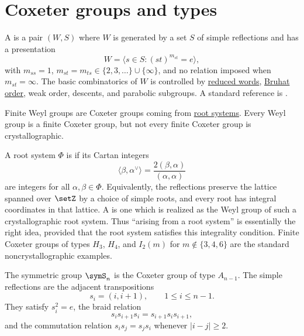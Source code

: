 
\section[coxeterGroups]{Coxeter groups and types}

A \label{coxeterSystemDefinition} is a pair \((W,S)\)
where \(W\) is generated by a set \(S\) of simple reflections and has a
presentation
\[
  W=\langle s\in S : (st)^{m_{st}}=e\rangle,
\]
with \(m_{ss}=1\), \(m_{st}=m_{ts}\in\{2,3,\dotsc\}\cup\{\infty\}\), and no
relation imposed when \(m_{st}=\infty\).  The basic combinatorics of \(W\)
is controlled by \hyperref[reducedWord]{reduced words},
\hyperref[bruhatOrder]{Bruhat order}, weak order, descents, and parabolic
subgroups.  A standard reference is \cite{Bjorner2005}.

Finite Weyl groups are Coxeter groups coming from
\hyperref[rootSystem]{root systems}.  Every Weyl group is a finite Coxeter
group, but not every finite Coxeter group is crystallographic.

A root system \(\Phi\) is  if its Cartan integers
\[
  \langle\beta,\alpha^\vee\rangle
  =
  \frac{2(\beta,\alpha)}{(\alpha,\alpha)}
\]
are integers for all \(\alpha,\beta\in\Phi\).  Equivalently, the reflections
preserve the lattice spanned over \(\setZ\) by a choice of simple roots, and
every root has integral coordinates in that lattice.  A
\label{crystallographicCoxeterGroup} is
one which is realized as the Weyl group of such a crystallographic root
system.  Thus \enquote{arising from a root system} is essentially the right
idea, provided that the root system satisfies this integrality condition.
Finite Coxeter groups of types \(H_3\), \(H_4\), and \(I_2(m)\) for
\(m\notin\{3,4,6\}\) are the standard noncrystallographic examples.

\begin{example}
The symmetric group \(\symS_n\) is the Coxeter group of type \(A_{n-1}\).
The simple reflections are the adjacent transpositions
\[
  s_i=(i,i+1),\qquad 1\leq i\leq n-1.
\]
They satisfy \(s_i^2=e\), the braid relation
\[
  s_is_{i+1}s_i=s_{i+1}s_is_{i+1},
\]
and the commutation relation \(s_is_j=s_js_i\) whenever \(|i-j|\geq 2\).
\end{example}

